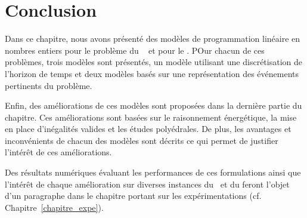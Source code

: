 \section{Conclusion}

Dans ce chapitre, nous avons présenté des modèles de programmation
linéaire en nombres entiers pour le problème du \RCPSP~ et pour le
\CECSP. POur chacun de ces problèmes, trois modèles sont présentés,
un modèle utilisant une discrétisation de l'horizon de temps et deux
modèles basés sur une représentation des événements pertinents du
problème. 

Enfin, des améliorations de ces modèles sont proposées dans la
dernière partie du chapitre. Ces améliorations sont basées sur le
raisonnement énergétique, la mise en place d'inégalités valides et les
études polyédrales. De plus, les avantages et inconvénients de chacun
des modèles sont décrits ce qui permet de justifier l'intérêt de ces
améliorations. 

Des résultats numériques évaluant les performances de ces formulations
ainsi que l'intérêt de chaque amélioration sur diverses instances du
\CECSP~et du \RCPSP feront l'objet d'un paragraphe dans le chapitre
portant sur les expérimentations (cf. Chapitre~\ref{chapitre_expe}). 